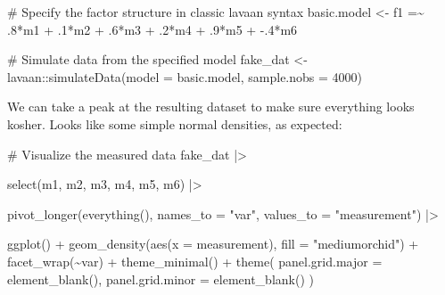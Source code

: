 \documentclass[
  letterpaper,
  DIV=11,
  numbers=noendperiod]{scrreprt}
\newenvironment{Shaded}{\begin{snugshade}}{\end{snugshade}}
\newcommand{\AttributeTok}[1]{\textcolor[rgb]{0.40,0.45,0.13}{#1}}
\newcommand{\CommentTok}[1]{\textcolor[rgb]{0.37,0.37,0.37}{#1}}
\newcommand{\DecValTok}[1]{\textcolor[rgb]{0.68,0.00,0.00}{#1}}
\newcommand{\FunctionTok}[1]{\textcolor[rgb]{0.28,0.35,0.67}{#1}}
\newcommand{\NormalTok}[1]{\textcolor[rgb]{0.00,0.23,0.31}{#1}}
\newcommand{\OtherTok}[1]{\textcolor[rgb]{0.00,0.23,0.31}{#1}}
\newcommand{\SpecialCharTok}[1]{\textcolor[rgb]{0.37,0.37,0.37}{#1}}
\newcommand{\StringTok}[1]{\textcolor[rgb]{0.13,0.47,0.30}{#1}}
\begin{document}
\begin{Shaded}
\begin{Highlighting}[]
\CommentTok{\# Specify the factor structure in classic lavaan syntax}
\NormalTok{basic.model }\OtherTok{\textless{}{-}} \StringTok{\textquotesingle{} }
\StringTok{  f1 =\textasciitilde{} .8*m1 + .1*m2 + .6*m3 + .2*m4 + .9*m5 + {-}.4*m6}
\StringTok{\textquotesingle{}}

\CommentTok{\# Simulate data from the specified model }
\NormalTok{fake\_dat }\OtherTok{\textless{}{-}}\NormalTok{ lavaan}\SpecialCharTok{::}\FunctionTok{simulateData}\NormalTok{(}\AttributeTok{model =}\NormalTok{ basic.model, }\AttributeTok{sample.nobs =} \DecValTok{4000}\NormalTok{)}
\end{Highlighting}
\end{Shaded}

We can take a peak at the resulting dataset to make sure everything
looks kosher. Looks like some simple normal densities, as expected:

\begin{Shaded}
\begin{Highlighting}[]
\CommentTok{\# Visualize the measured data}
\NormalTok{fake\_dat }\SpecialCharTok{|\textgreater{}}

  \FunctionTok{select}\NormalTok{(m1, m2, m3, m4, m5, m6) }\SpecialCharTok{|\textgreater{}}
  
  \FunctionTok{pivot\_longer}\NormalTok{(}\FunctionTok{everything}\NormalTok{(), }\AttributeTok{names\_to =} \StringTok{"var"}\NormalTok{, }\AttributeTok{values\_to =} \StringTok{"measurement"}\NormalTok{) }\SpecialCharTok{|\textgreater{}}

  \FunctionTok{ggplot}\NormalTok{() }\SpecialCharTok{+}
  \FunctionTok{geom\_density}\NormalTok{(}\FunctionTok{aes}\NormalTok{(}\AttributeTok{x =}\NormalTok{ measurement), }\AttributeTok{fill =} \StringTok{"mediumorchid"}\NormalTok{) }\SpecialCharTok{+}
  \FunctionTok{facet\_wrap}\NormalTok{(}\SpecialCharTok{\textasciitilde{}}\NormalTok{var) }\SpecialCharTok{+}
  \FunctionTok{theme\_minimal}\NormalTok{() }\SpecialCharTok{+}
  \FunctionTok{theme}\NormalTok{(}
    \AttributeTok{panel.grid.major =} \FunctionTok{element\_blank}\NormalTok{(),}
    \AttributeTok{panel.grid.minor =} \FunctionTok{element\_blank}\NormalTok{()}
\NormalTok{  )}
\end{Highlighting}
\end{Shaded}
\end{document}
